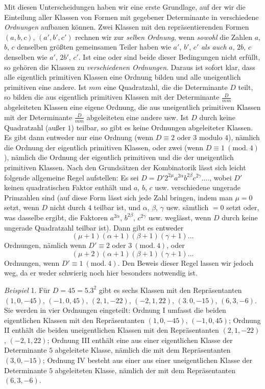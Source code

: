 Mit diesen Unterscheidungen haben wir eine erste Grundlage, auf der wir die Einteilung aller Klassen von Formen mit gegebener Determinante in verschiedene \textit{Ordnungen} aufbauen können. Zwei Klassen mit den repräsentierenden Formen $(a,b,c)$, $(a',b',c')$ rechnen wir zur \textit{selben Ordnung}, wenn \textit{sowohl} die Zahlen $a$, $b$, $c$ denselben größten gemeinsamen Teiler haben wie $a'$, $b'$, $c'$ \textit{als auch} $a$, $2b$, $c$ denselben wie $a'$, $2b'$, $c'$. Ist eine oder sind beide dieser Bedingungen nicht erfüllt, so gehören die Klassen zu \textit{verschiedenen Ordnungen}. Daraus ist sofort klar, dass alle eigentlich primitiven Klassen eine Ordnung bilden und alle uneigentlich primitiven eine andere. Ist $mm$ eine Quadratzahl, die die Determinante $D$ teilt, so bilden die aus eigentlich primitiven Klassen mit der Determinante $\frac{D}{mm}$ abgeleiteten Klassen eine eigene Ordnung, die aus uneigentlich primitiven Klassen mit der Determinante $\frac{D}{mm}$ abgeleiteten eine andere usw. Ist $D$ durch keine Quadratzahl (außer $1$) teilbar, so gibt es keine Ordnungen abgeleiteter Klassen. Es gibt dann entweder nur eine Ordnung (wenn $D\equiv2$ oder $3$ modulo $4$), nämlich die Ordnung der eigentlich primitiven Klassen, oder zwei (wenn $D\equiv1\ (\mathrm{mod.}\ 4)$), nämlich die Ordnung der eigentlich primitiven und die der uneigentlich primitiven Klassen. Nach den Grundsätzen der Kombinatorik lässt sich leicht folgende allgemeine Regel aufstellen: Es sei $D=D'2^{2\mu}a^{2\alpha}b^{2\beta}c^{2\gamma}\ldots.$, wobei $D'$ keinen quadratischen Faktor enthält und $a$, $b$, $c$ usw. verschiedene ungerade Primzahlen sind (auf diese Form lässt sich jede Zahl bringen, indem man $\mu=0$ setzt, wenn $D$ nicht durch $4$ teilbar ist, und $\alpha$, $\beta$, $\gamma$ usw. sämtlich $=0$ setzt oder, was dasselbe ergibt, die Faktoren $a^{2\alpha}$, $b^{2\beta}$, $c^{2\gamma}$ usw. weglässt, wenn $D$ durch keine ungerade Quadratzahl teilbar ist). Dann gibt es entweder
\[
(\mu+1)(\alpha+1)(\beta+1)(\gamma+1)\ldots
\]
Ordnungen, nämlich wenn $D'\equiv2$ oder $3\ (\mathrm{mod.}\ 4)$, oder
\[
(\mu+2)(\alpha+1)(\beta+1)(\gamma+1)\ldots
\]
Ordnungen, wenn $D'\equiv1\ (\mathrm{mod.}\ 4)$. Den Beweis dieser Regel lassen wir jedoch weg, da er weder schwierig noch hier besonders notwendig ist.

\textit{Beispiel} 1. Für $D=45=5.3^2$ gibt es sechs Klassen mit den Repräsentanten $(1,0,-45)$, $(-1.\,0,45)$, $(2,1,-22)$, $(-2,1,22)$, $(3.\,0,-15)$, $(6,3,-6)$. Sie werden in vier Ordnungen eingeteilt: Ordnung I umfasst die beiden eigentlichen Klassen mit den Repräsentanten $(1,0,-45)$, $(-1,0,45)$; Ordnung II enthält die beiden uneigentlichen Klassen mit den Repräsentanten $(2,1,-22)$, $(-2,1,22)$; Ordnung III enthält eine aus einer eigentlichen Klasse der Determinante $5$ abgeleitete Klasse, nämlich die mit dem Repräsentanten $(3,0,-15)$; Ordnung IV besteht aus einer aus einer uneigentlichen Klasse der Determinante $5$ abgeleiteten Klasse, nämlich der mit dem Repräsentanten $(6,3,-6)$.

